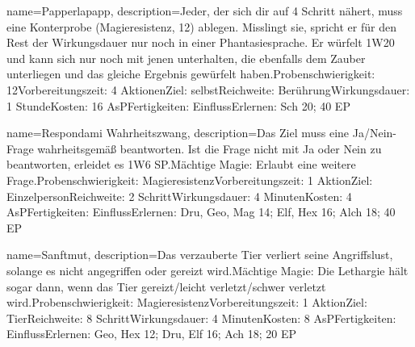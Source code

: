 {
    name={Papperlapapp},
    description={Jeder, der sich dir auf 4 Schritt nähert, muss eine Konterprobe (Magieresistenz, 12) ablegen. Misslingt sie, spricht er für den Rest der Wirkungsdauer nur noch in einer Phantasiesprache. Er würfelt 1W20 und kann sich nur noch mit jenen unterhalten, die ebenfalls dem Zauber unterliegen und das gleiche Ergebnis gewürfelt haben.\newline Probenschwierigkeit: 12\newline Vorbereitungszeit: 4 Aktionen\newline Ziel: selbst\newline Reichweite: Berührung\newline Wirkungsdauer: 1 Stunde\newline Kosten: 16 AsP\newline Fertigkeiten: Einfluss\newline Erlernen: Sch 20; 40 EP}
}


{
    name={Respondami Wahrheitszwang},
    description={Das Ziel muss eine Ja/Nein-Frage wahrheitsgemäß beantworten. Ist die Frage nicht mit Ja oder Nein zu beantworten, erleidet es 1W6 SP.\newline Mächtige Magie: Erlaubt eine weitere Frage.\newline Probenschwierigkeit: Magieresistenz\newline Vorbereitungszeit: 1 Aktion\newline Ziel: Einzelperson\newline Reichweite: 2 Schritt\newline Wirkungsdauer: 4 Minuten\newline Kosten: 4 AsP\newline Fertigkeiten: Einfluss\newline Erlernen: Dru, Geo, Mag 14; Elf, Hex 16; Alch 18; 40 EP}
}


{
    name={Sanftmut},
    description={Das verzauberte Tier verliert seine Angriffslust, solange es nicht angegriffen oder gereizt wird.\newline Mächtige Magie: Die Lethargie hält sogar dann, wenn das Tier gereizt/leicht verletzt/schwer verletzt wird.\newline Probenschwierigkeit: Magieresistenz\newline Vorbereitungszeit: 1 Aktion\newline Ziel: Tier\newline Reichweite: 8 Schritt\newline Wirkungsdauer: 4 Minuten\newline Kosten: 8 AsP\newline Fertigkeiten: Einfluss\newline Erlernen: Geo, Hex 12; Dru, Elf 16; Ach 18; 20 EP}
}


